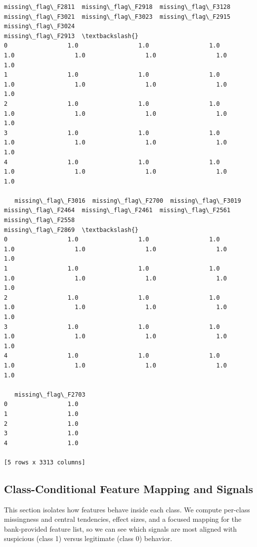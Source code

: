 \documentclass[11pt]{article}
\begin{document}
\begin{Verbatim}[commandchars=\\\{\}]
   missing\_flag\_F2811  missing\_flag\_F2918  missing\_flag\_F3128
missing\_flag\_F3021  missing\_flag\_F3023  missing\_flag\_F2915  missing\_flag\_F3024
missing\_flag\_F2913  \textbackslash{}
0                 1.0                 1.0                 1.0
1.0                 1.0                 1.0                 1.0
1.0
1                 1.0                 1.0                 1.0
1.0                 1.0                 1.0                 1.0
1.0
2                 1.0                 1.0                 1.0
1.0                 1.0                 1.0                 1.0
1.0
3                 1.0                 1.0                 1.0
1.0                 1.0                 1.0                 1.0
1.0
4                 1.0                 1.0                 1.0
1.0                 1.0                 1.0                 1.0
1.0

   missing\_flag\_F3016  missing\_flag\_F2700  missing\_flag\_F3019
missing\_flag\_F2464  missing\_flag\_F2461  missing\_flag\_F2561  missing\_flag\_F2558
missing\_flag\_F2869  \textbackslash{}
0                 1.0                 1.0                 1.0
1.0                 1.0                 1.0                 1.0
1.0
1                 1.0                 1.0                 1.0
1.0                 1.0                 1.0                 1.0
1.0
2                 1.0                 1.0                 1.0
1.0                 1.0                 1.0                 1.0
1.0
3                 1.0                 1.0                 1.0
1.0                 1.0                 1.0                 1.0
1.0
4                 1.0                 1.0                 1.0
1.0                 1.0                 1.0                 1.0
1.0

   missing\_flag\_F2703
0                 1.0
1                 1.0
2                 1.0
3                 1.0
4                 1.0

[5 rows x 3313 columns]
    \end{Verbatim}

    \subsection{Class-Conditional Feature Mapping and
Signals}\label{class-conditional-feature-mapping-and-signals}

This section isolates how features behave inside each class. We compute
per-class missingness and central tendencies, effect sizes, and a
focused mapping for the bank-provided feature list, so we can see which
signals are most aligned with suspicious (class 1) versus legitimate
(class 0) behavior.
\end{document}
